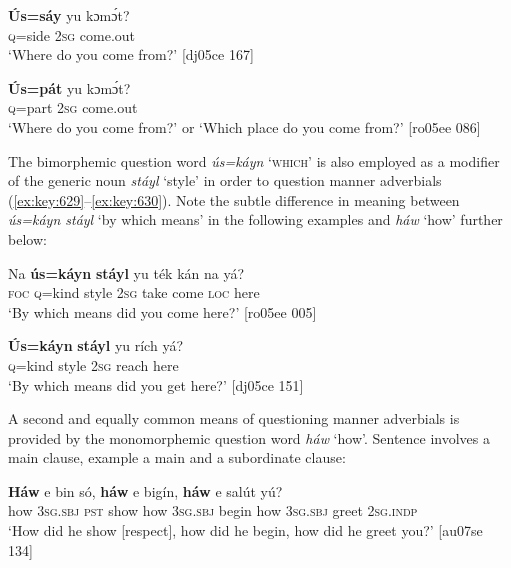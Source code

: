 \ea%
    \label{ex:key:627}
    \gll \textbf{\'{U}s=sáy}  yu  kɔmɔ́t?\\
\textsc{q}=side  \textsc{2sg}  come.out\\

\glt ‘Where do you come from?’ [dj05ce 167]
\z


\ea%
    \label{ex:key:628}
    \gll \textbf{\'{U}s=pát}  yu  kɔmɔ́t?\\
\textsc{q}=part  \textsc{2sg}  come.out\\

\glt ‘Where do you come from?’ or  ‘Which place do you come from?’ [ro05ee 086]
\z

The bimorphemic question word \textit{ús=káyn} ‘\textsc{which’} is also employed as a modifier of the generic noun \textit{stáyl} ‘style’ in order to question manner adverbials (\ref{ex:key:629}–\ref{ex:key:630}). Note the subtle difference in meaning between \textit{ús=káyn stáyl} ‘by which means’ in the following examples and \textit{háw} ‘how’ further below:


\ea%
    \label{ex:key:629}
    \gll Na  \textbf{ús=káyn}  \textbf{stáyl}  yu  ték    kán    na  yá?\\
\textsc{foc}  \textsc{q}=kind  style  \textsc{2sg}  take    come  \textsc{loc}  here\\

\glt ‘By which means did you come here?’ [ro05ee 005]\\
\z

\ea%
    \label{ex:key:630}
    \gll \textbf{\'{U}s=káyn} \textbf{stáyl} yu  rích    yá?\\
\textsc{q}=kind    style  \textsc{2sg}  reach  here\\
\glt ‘By which means did you get here?’ [dj05ce 151]
\z

A second and equally common means of questioning manner adverbials is provided by the monomorphemic question word \textit{háw} ‘how’. Sentence  involves a main clause, example  a main and a subordinate clause: 


\ea%
    \label{ex:key:631}
    \gll \textbf{Háw}  e    bin  só,    \textbf{háw}    e    bigín,
\textbf{háw}   e    salút  yú?\\
how    \textsc{3sg.sbj}  \textsc{pst}  show  how    \textsc{3sg.sbj}  begin
how    \textsc{3sg.sbj}  greet  \textsc{2sg.indp}\\

\glt ‘How did he show [respect], how did he begin, how did he greet you?’ [au07se 134]
\z


